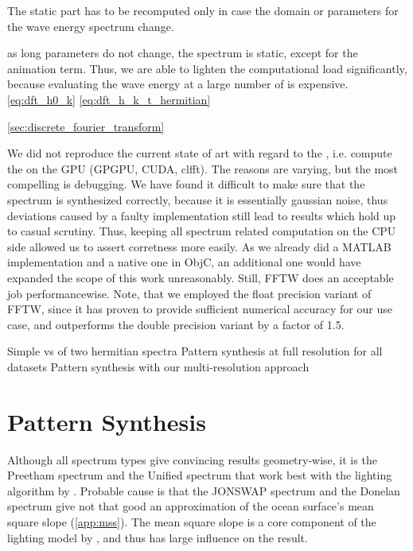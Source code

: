 The static part has to be recomputed only in
case the \wavevector domain or parameters for the wave energy spectrum change.

as long parameters do
not change, the spectrum is static, except for the animation term. Thus, we are
able to lighten the computational load significantly, because evaluating the
wave energy at a large number of \wavenumbers is expensive.
\ref{eq:dft_h0_k}
\ref{eq:dft_h_k_t_hermitian}

\ref{sec:discrete_fourier_transform}




We did not reproduce the current state of art with regard to the \FourierTransform,
i.e. compute the \IDFT on the GPU (GPGPU, CUDA, clfft). The reasons are varying,
but the most compelling is debugging. We have found it difficult to make sure
that the spectrum is synthesized correctly, because it is essentially gaussian noise,
thus deviations caused by a faulty implementation still lead to results which hold
up to casual scrutiny. Thus, keeping all spectrum related computation on the
CPU side allowed us to assert corretness more easily.
As we already did a MATLAB implementation and a native one
in ObjC, an additional one would have expanded the scope of this work unreasonably.
Still, FFTW does an acceptable job performancewise. Note, that we employed the
float precision variant of FFTW, since it has proven to provide sufficient
numerical accuracy for our use case, and outperforms the double precision variant
by a factor of 1.5.

Simple \InvFourierTransform vs \InvFourierTransform of two hermitian spectra
Pattern synthesis at full resolution for all datasets
Pattern synthesis with our multi-resolution approach

\section{Pattern Synthesis}
\label{sec:results:synthesis}
Although all spectrum types give convincing results geometry-wise, it is the
Preetham spectrum and the Unified spectrum that work best with the lighting
algorithm by \cite{article:oceanlighting}. Probable cause is that the JONSWAP
spectrum and the Donelan spectrum give not that good an approximation of the
ocean surface's mean square slope (\ref{app:mss}). The mean square slope is a
core component of the lighting model by \cite{article:oceanlighting}, and thus
has large influence on the result.

